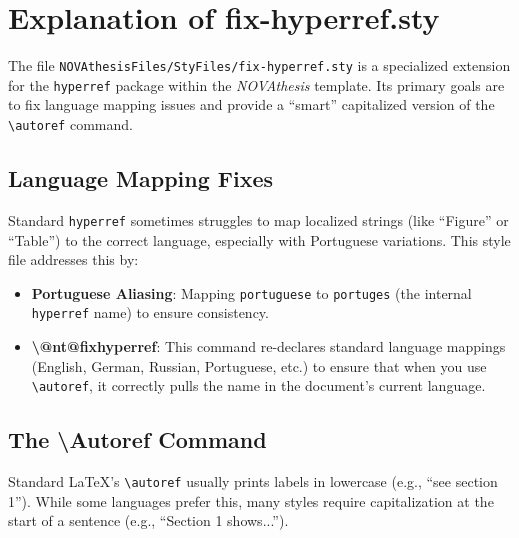 

\chapter{Explanation of fix-hyperref.sty}
\label{annex:fix-hyperref}

The file \texttt{NOVAthesisFiles/StyFiles/fix-hyperref.sty} is a specialized extension for the \texttt{hyperref} package within the \emph{NOVAthesis} template. Its primary goals are to fix language mapping issues and provide a ``smart'' capitalized version of the \texttt{\textbackslash autoref} command.

\section{Language Mapping Fixes}
Standard \texttt{hyperref} sometimes struggles to map localized strings (like ``Figure'' or ``Table'') to the correct language, especially with Portuguese variations. This style file addresses this by:
\begin{itemize}
    \item \textbf{Portuguese Aliasing}: Mapping \texttt{portuguese} to \texttt{portuges} (the internal \texttt{hyperref} name) to ensure consistency.
    \item \textbf{\textbackslash @nt@fixhyperref}: This command re-declares standard language mappings (English, German, Russian, Portuguese, etc.) to ensure that when you use \texttt{\textbackslash autoref}, it correctly pulls the name in the document's current language.
\end{itemize}

\section{The \textbackslash Autoref Command}
Standard \LaTeX's \texttt{\textbackslash autoref} usually prints labels in lowercase (e.g., ``see section 1''). While some languages prefer this, many styles require capitalization at the start of a sentence (e.g., ``Section 1 shows...'').

